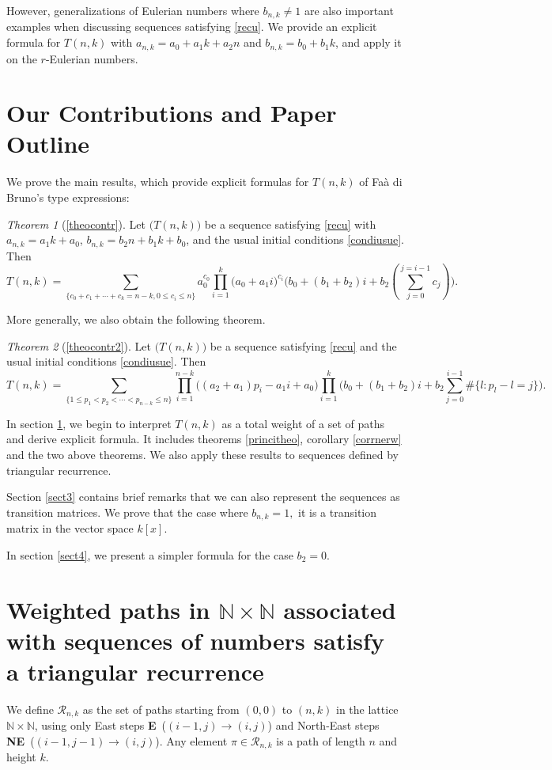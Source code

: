 \documentclass[12pt,a4paper]{article}
\theoremstyle{definition} %
\theoremstyle{remark}
\theoremstyle{examples}
\newtheorem*{theoremts}{Theorem}
\newcommand{\chegg}{\mathcal{R}_{n,k}}
\newcommand{\suit}[1]{{#1}(n,k)}
\newcommand{\coul}[1]{#1_{n,k}}
\newcommand{\es}{\textbf{E}}
\newcommand{\nes}{\textbf{NE}}
\newcommand{\natu}{\mathbb{N}}
\newcommand{\coss}{\cdots}
\begin{document}
	
	 However, generalizations of Eulerian numbers where $\coul{b}\neq 1$ are also important examples when discussing sequences satisfying \eqref{recu}. We provide an explicit formula for $T(n,k)$ with $a_{n,k}=a_0+a_1k+a_2n$ and $b_{n,k}=b_0+b_1k$, and apply it on the $r$-Eulerian numbers.
	 

	\section*{Our Contributions and Paper Outline}
\noindent	We prove the main results, which provide explicit formulas for $T(n,k)$ of Fa\`a di Bruno's type expressions:
\begin{theoremts}[\ref{theocontr}]
	Let $\big(\suit{T}\big)$ be a sequence satisfying \eqref{recu} with $\coul{a} = a_1 k + a_0$, $\coul{b} = b_2n+b_1k+b_0$, and the usual initial conditions \eqref{condiusue}. 
	Then
	\begin{equation*}
		\suit{T} = \sum_{\{c_0+c_1+\coss+c_{k}=n-k, 0\leq c_i\leq n\}}  a_0^{c_0}\prod_{i=1}^{k} \big(a_0+a_1i\big)^{c_{i}} \Big(b_0+ (b_1+b_2)i+b_2 (\sum_{j=0}^{j=i-1}c_j) \Big).
	\end{equation*}
\end{theoremts}
\noindent More generally, we also obtain the following theorem.
\begin{theoremts}[\ref{theocontr2}]
	Let $\big(\suit{T}\big)$ be a sequence satisfying \eqref{recu} and the usual initial conditions \eqref{condiusue}. 
	Then
	\begin{equation*}
		\suit{T}
		= \sum_{\{1\leq p_1<p_2<\cdots <p_{n-k}\leq n\}}
		\prod_{i=1}^{n-k} \Big( (a_2+a_1)p_i-a_1 i+a_0 \Big)
		\prod_{i=1}^{k} \Big(b_0+ (b_1+b_2)i+b_2 \sum_{j=0}^{i-1}\# \{l: p_l-l=j\} \Big).
	\end{equation*}
\end{theoremts}
In section \ref{sect2}, we begin to interpret $T(n,k)$ as  a total weight of a set of paths and derive explicit formula. It includes theorems \ref{princitheo}, corollary \ref{corrnerw} and the two above theorems. We also apply these results to sequences defined by triangular recurrence. 

Section \ref{sect3} contains brief remarks that we can also represent the sequences as transition matrices. We prove that the case where $b_{n,k}=1,$ it is a transition matrix in the vector space $k[x]$.

In section \ref{sect4}, we present a simpler formula for the case $b_2=0$.
	\section{Weighted paths in $\mathbb{N}\times \mathbb{N}$ associated with sequences of numbers satisfy a triangular recurrence}\label{sect2}
		We define $\chegg$ as the set of paths starting from $(0,0)$ to $(n,k)$ in the lattice $\natu \times \natu$, using only 
		East steps \es\ \big($(i-1,j)\to (i,j)$\big) and North-East steps \nes\ \big($(i-1,j-1)\to (i,j)$\big).  Any element $\pi\in\mathcal{R}_{n,k}$ is a path of length $n$ and height $k$.
				
\end{document}
